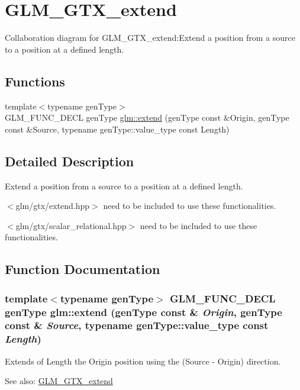 \hypertarget{group__gtx__extend}{
\section{GLM\_\-GTX\_\-extend}
\label{group__gtx__extend}
}


Collaboration diagram for GLM\_\-GTX\_\-extend:Extend a position from a source to a position at a defined length.  
\subsection*{Functions}
\begin{CompactItemize}
\item 
{\footnotesize template$<$typename genType$>$ }\\GLM\_\-FUNC\_\-DECL genType \hyperlink{group__gtx__extend_g58f71cd2eec18e104f500a437ed9dd7d}{glm::extend} (genType const \&Origin, genType const \&Source, typename genType::value\_\-type const Length)
\end{CompactItemize}


\subsection{Detailed Description}
Extend a position from a source to a position at a defined length. 

$<$glm/gtx/extend.hpp$>$ need to be included to use these functionalities.

$<$glm/gtx/scalar\_\-relational.hpp$>$ need to be included to use these functionalities. 

\subsection{Function Documentation}
\hypertarget{group__gtx__extend_g58f71cd2eec18e104f500a437ed9dd7d}{
\subsubsection[extend]{\setlength{\rightskip}{0pt plus 5cm}template$<$typename genType$>$ GLM\_\-FUNC\_\-DECL genType glm::extend (genType const \& {\em Origin}, \/  genType const \& {\em Source}, \/  typename genType::value\_\-type const  {\em Length})}}
\label{group__gtx__extend_g58f71cd2eec18e104f500a437ed9dd7d}


Extends of Length the Origin position using the (Source - Origin) direction. \begin{Desc}
\item[See also:]\hyperlink{group__gtx__extend}{GLM\_\-GTX\_\-extend} \end{Desc}
